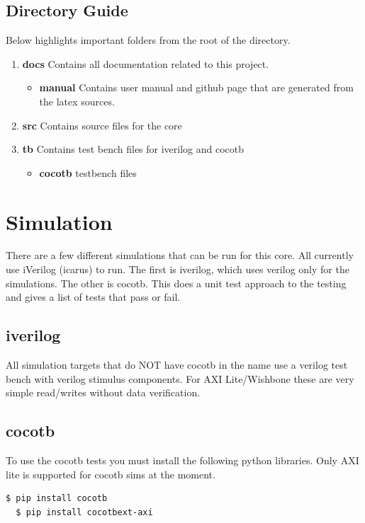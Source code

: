 \subsection{Directory Guide}

\par
Below highlights important folders from the root of the directory.

\begin{enumerate}
  \item \textbf{docs} Contains all documentation related to this project.
    \begin{itemize}
      \item \textbf{manual} Contains user manual and github page that are generated from the latex sources.
    \end{itemize}
  \item \textbf{src} Contains source files for the core
  \item \textbf{tb} Contains test bench files for iverilog and cocotb
    \begin{itemize}
      \item \textbf{cocotb} testbench files
    \end{itemize}
\end{enumerate}

\newpage

\section{Simulation}
\par
There are a few different simulations that can be run for this core. All currently use iVerilog (icarus) to run. The first is iverilog, which
uses verilog only for the simulations. The other is cocotb. This does a unit test approach to the testing and gives a list of tests that pass
or fail.

\subsection{iverilog}
\par
All simulation targets that do NOT have cocotb in the name use a verilog test bench with verilog stimulus components. For AXI Lite/Wishbone these
are very simple read/writes without data verification.

\subsection{cocotb}
\par
To use the cocotb tests you must install the following python libraries. Only AXI lite is supported for cocotb sims at the moment.
\begin{lstlisting}[language=bash]
  $ pip install cocotb
  $ pip install cocotbext-axi
\end{lstlisting}

